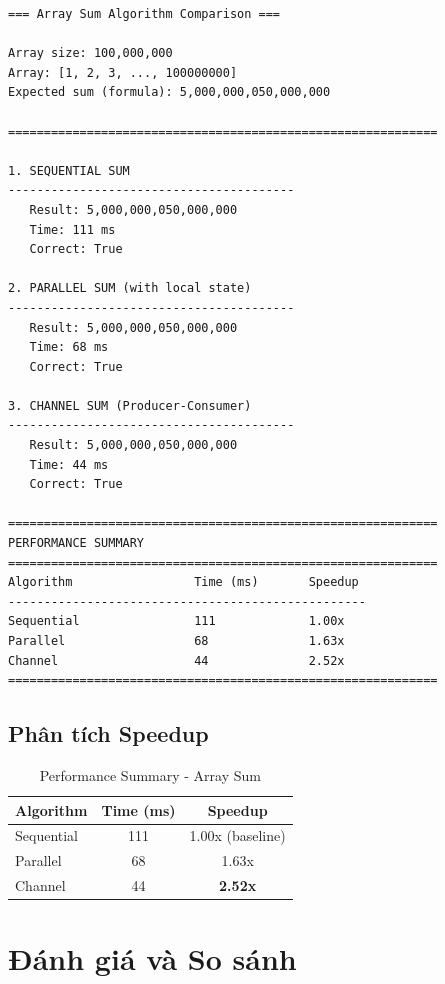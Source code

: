 \documentclass[12pt,a4paper]{article}
\begin{document}
\begin{Verbatim}[frame=single, fontsize=\small]
=== Array Sum Algorithm Comparison ===

Array size: 100,000,000
Array: [1, 2, 3, ..., 100000000]
Expected sum (formula): 5,000,000,050,000,000

============================================================

1. SEQUENTIAL SUM
----------------------------------------
   Result: 5,000,000,050,000,000
   Time: 111 ms
   Correct: True

2. PARALLEL SUM (with local state)
----------------------------------------
   Result: 5,000,000,050,000,000
   Time: 68 ms
   Correct: True

3. CHANNEL SUM (Producer-Consumer)
----------------------------------------
   Result: 5,000,000,050,000,000
   Time: 44 ms
   Correct: True

============================================================
PERFORMANCE SUMMARY
============================================================
Algorithm                 Time (ms)       Speedup
--------------------------------------------------
Sequential                111             1.00x
Parallel                  68              1.63x
Channel                   44              2.52x
============================================================
\end{Verbatim}

\subsection{Phân tích Speedup}

\begin{table}[h]
\centering
\begin{tabular}{|l|c|c|}
\hline
\textbf{Algorithm} & \textbf{Time (ms)} & \textbf{Speedup} \\
\hline
Sequential & 111 & 1.00x (baseline) \\
\hline
Parallel & 68 & 1.63x \\
\hline
Channel & 44 & \textbf{2.52x} \\
\hline
\end{tabular}
\caption{Performance Summary - Array Sum}
\end{table}

\section{Đánh giá và So sánh}
\end{document}
